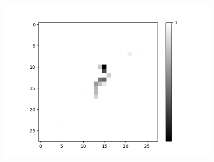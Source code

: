 \begin{figure}[H]
\begin{minipage}[b]{0.19\textwidth}
	\includegraphics[width=\textwidth]{OR-AND(W-LSM)(1)/DontLike/False/Layer0-Neuron-28.png}
	\label{}
\end{minipage}
	\hfill
\end{figure}

